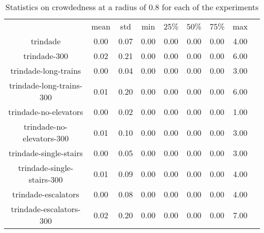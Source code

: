 \begin{table*}
    \begin{tabular}{|c|cccccccc|}
      & mean & std & min & 25\% & 50\% & 75\% & max \\
    trindade  & 0.00 & 0.07 & 0.00 & 0.00 & 0.00 & 0.00 & 4.00 \\
    trindade-300  & 0.02 & 0.21 & 0.00 & 0.00 & 0.00 & 0.00 & 6.00 \\
    trindade-long-trains  & 0.00 & 0.04 & 0.00 & 0.00 & 0.00 & 0.00 & 3.00 \\
    trindade-long-trains-300  & 0.01 & 0.20 & 0.00 & 0.00 & 0.00 & 0.00 & 6.00 \\
    trindade-no-elevators  & 0.00 & 0.02 & 0.00 & 0.00 & 0.00 & 0.00 & 1.00 \\
    trindade-no-elevators-300  & 0.01 & 0.10 & 0.00 & 0.00 & 0.00 & 0.00 & 3.00 \\
    trindade-single-stairs  & 0.00 & 0.05 & 0.00 & 0.00 & 0.00 & 0.00 & 3.00 \\
    trindade-single-stairs-300  & 0.01 & 0.09 & 0.00 & 0.00 & 0.00 & 0.00 & 4.00 \\
    trindade-escalators  & 0.00 & 0.08 & 0.00 & 0.00 & 0.00 & 0.00 & 4.00 \\
    trindade-escalators-300  & 0.02 & 0.20 & 0.00 & 0.00 & 0.00 & 0.00 & 7.00 \\
    \end{tabular}
\caption{Statistics on crowdedness at a radius of 0.8 for each of the experiments}
\label{annex:crowdedness_0.8}

\end{table*}



